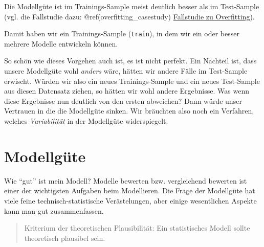\documentclass[12pt,]{book}
\newenvironment{Shaded}{\begin{snugshade}}{\end{snugshade}}
\newcommand{\KeywordTok}[1]{\textcolor[rgb]{0.13,0.29,0.53}{\textbf{{#1}}}}
\newcommand{\DataTypeTok}[1]{\textcolor[rgb]{0.13,0.29,0.53}{{#1}}}
\newcommand{\DecValTok}[1]{\textcolor[rgb]{0.00,0.00,0.81}{{#1}}}
\newcommand{\StringTok}[1]{\textcolor[rgb]{0.31,0.60,0.02}{{#1}}}
\newcommand{\CommentTok}[1]{\textcolor[rgb]{0.56,0.35,0.01}{\textit{{#1}}}}
\newcommand{\OtherTok}[1]{\textcolor[rgb]{0.56,0.35,0.01}{{#1}}}
\newcommand{\NormalTok}[1]{{#1}}
\begin{document}
Die Modellgüte ist im Trainings-Sample meist deutlich besser als im
Test-Sample (vgl. die Fallstudie dazu: @ref(overfitting\_casestudy)
\protect\hyperlink{overfitting_casestudy}{Fallstudie zu Overfitting}).

\begin{Shaded}
\end{Shaded}

Damit haben wir ein Trainings-Sample (\texttt{train}), in dem wir ein
oder besser mehrere Modelle entwickeln können.

So schön wie dieses Vorgehen auch ist, es ist nicht perfekt. Ein
Nachteil ist, dass unsere Modellgüte wohl \emph{anders} wäre, hätten wir
andere Fälle im Test-Sample erwischt. Würden wir also ein neues
Trainings-Sample und ein neues Test-Sample aus diesen Datensatz ziehen,
so hätten wir wohl andere Ergebnisse. Was wenn diese Ergebnisse nun
deutlich von den ersten abweichen? Dann würde unser Vertrauen in die die
Modellgüte sinken. Wir bräuchten also noch ein Verfahren, welches
\emph{Variabilität} in der Modellgüte widerspiegelt.

\section{Modellgüte}\label{modellgute}

Wie ``gut'' ist mein Modell? Modelle bewerten bzw. vergleichend bewerten
ist einer der wichtigsten Aufgaben beim Modellieren. Die Frage der
Modellgüte hat viele feine technisch-statistische Verästelungen, aber
einige wesentlichen Aspekte kann man gut zusammenfassen.

\begin{quote}
Kriterium der theoretischen Plausibilität: Ein statistisches Modell
sollte theoretisch plausibel sein.
\end{quote}
\end{document}
